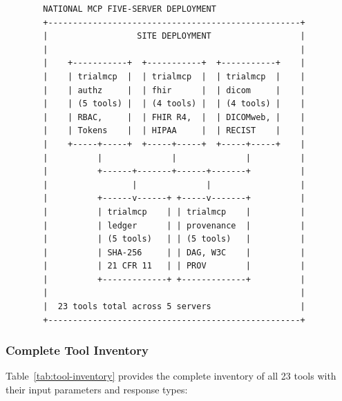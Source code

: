 \documentclass{article}
\begin{document}
\begin{figure}[H]
\begin{verbatim}
  NATIONAL MCP FIVE-SERVER DEPLOYMENT
  +---------------------------------------------------+
  |                  SITE DEPLOYMENT                  |
  |                                                   |
  |    +-----------+  +-----------+  +-----------+    |
  |    | trialmcp  |  | trialmcp  |  | trialmcp  |    |
  |    | authz     |  | fhir      |  | dicom     |    |
  |    | (5 tools) |  | (4 tools) |  | (4 tools) |    |
  |    | RBAC,     |  | FHIR R4,  |  | DICOMweb, |    |
  |    | Tokens    |  | HIPAA     |  | RECIST    |    |
  |    +-----+-----+  +-----+-----+  +-----+-----+    |
  |          |              |              |          |
  |          +------+-------+------+-------+          |
  |                 |              |                  |
  |          +------v------+ +-----v-------+          |
  |          | trialmcp    | | trialmcp    |          |
  |          | ledger      | | provenance  |          |
  |          | (5 tools)   | | (5 tools)   |          |
  |          | SHA-256     | | DAG, W3C    |          |
  |          | 21 CFR 11   | | PROV        |          |
  |          +-------------+ +-------------+          |
  |                                                   |
  |  23 tools total across 5 servers                  |
  +---------------------------------------------------+
\end{verbatim}
\end{figure}

\subsubsection{Complete Tool Inventory}

Table~\ref{tab:tool-inventory} provides the complete inventory of all 23 tools with their input parameters and response types:
\end{document}
